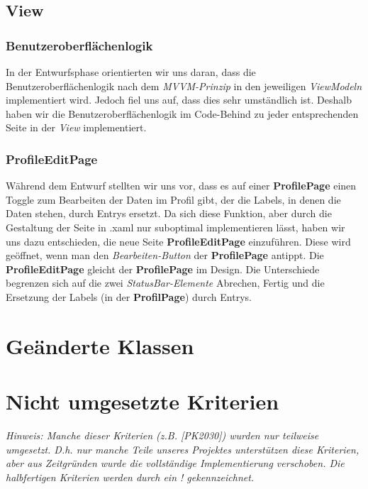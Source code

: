 \documentclass[a4paper]{scrreprt}
\begin{document}
\subsection{View}
\subsubsection{Benutzeroberflächenlogik}
In der Entwurfsphase orientierten wir uns daran, dass die Benutzeroberflächenlogik nach dem \textit{MVVM-Prinzip} in den jeweiligen \textit{ViewModeln} implementiert wird. Jedoch fiel uns auf, dass dies sehr umständlich ist. Deshalb haben wir die Benutzeroberflächenlogik im Code-Behind zu jeder entsprechenden Seite in der \textit{View} implementiert.
\subsubsection{ProfileEditPage}
Während dem Entwurf stellten wir uns vor, dass es auf einer \textbf{ProfilePage} einen Toggle zum Bearbeiten der Daten im Profil gibt, der die Labels, in denen die Daten stehen, durch Entrys ersetzt. Da sich diese Funktion, aber durch die Gestaltung der Seite in .xaml nur suboptimal implementieren lässt, haben wir uns dazu entschieden, die neue Seite \textbf{ProfileEditPage} einzuführen. Diese wird geöffnet, wenn man den \textit{Bearbeiten-Button
} der \textbf{ProfilePage} antippt. Die \textbf{ProfileEditPage} gleicht der \textbf{ProfilePage} im Design. Die Unterschiede begrenzen sich auf die zwei \textit{StatusBar-Elemente} \dq{}Abrechen\dq{}, \dq{}Fertig\dq{} und die Ersetzung der Labels (in der \textbf{ProfilPage}) durch Entrys.

\section{Geänderte Klassen}
\section{Nicht umgesetzte Kriterien}
\textit{Hinweis: Manche dieser Kriterien (z.B. [PK2030]) wurden nur teilweise umgesetzt. D.h. nur manche Teile unseres Projektes unterstützen diese Kriterien, aber aus Zeitgründen wurde die vollständige Implementierung verschoben. Die halbfertigen Kriterien werden durch ein \dq{}!\dq{} gekennzeichnet.}
\end{document}
